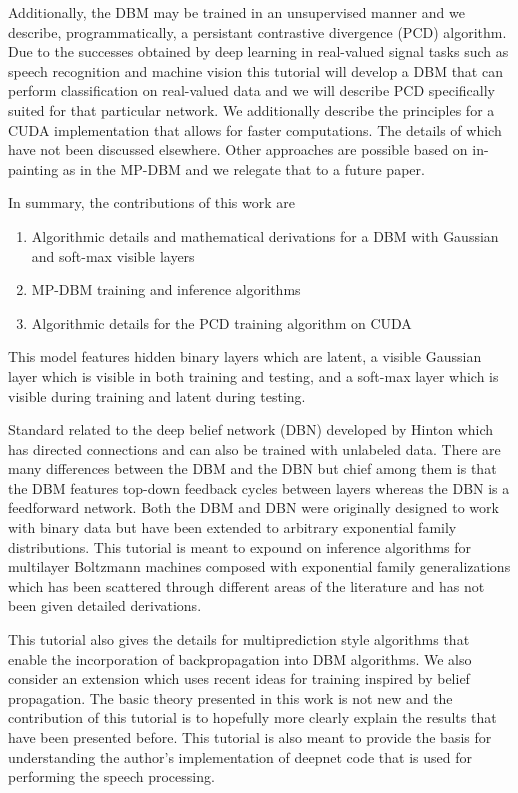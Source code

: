 \documentclass{article} %
\begin{document}
Additionally, the DBM may be trained in an unsupervised manner and we describe, programmatically, a persistant contrastive
divergence (PCD) algorithm. Due to the successes obtained by deep learning in real-valued signal
tasks such as speech recognition and machine vision this tutorial will
develop a DBM that can perform classification on real-valued data and we will describe PCD specifically suited for that
particular network.  We additionally describe the principles for a CUDA implementation
that allows for faster computations.  The details of which have not been discussed elsewhere.  Other approaches are possible based on in-painting
as in the MP-DBM and we relegate that to a future paper.

In summary, the contributions of this work are
\begin{enumerate}
\item Algorithmic details and mathematical derivations for a DBM with Gaussian and soft-max visible layers
\item MP-DBM training and inference algorithms
\item Algorithmic details for the PCD training algorithm on CUDA
\end{enumerate}


This model features hidden binary layers which are latent, a visible
Gaussian layer which is visible in both training and testing, and a
soft-max layer which is visible during training and latent during
testing.

  Standard related
to the deep belief network (DBN) developed by Hinton which has
directed connections and can also be trained with unlabeled data.
There are many differences between the DBM and the DBN but chief among
them is that the DBM features top-down feedback cycles between layers
whereas the DBN is a feedforward network.  Both the DBM and DBN were originally designed to work
with binary data but have been extended to arbitrary exponential family distributions.  This tutorial
is meant to expound on inference algorithms for multilayer Boltzmann machines composed with 
exponential family generalizations which has been scattered through different areas of the literature
and has not been given detailed derivations.

This tutorial also gives the details for multiprediction style algorithms that enable the incorporation
of backpropagation into DBM algorithms. We also consider an extension which uses recent ideas for training
inspired by belief propagation.  The basic theory presented in this work is not new and the contribution of this
tutorial is to hopefully more clearly explain the results that have been presented before. This tutorial is also meant
to provide the basis for understanding the author's implementation of deepnet code that is used for performing the
speech processing.
\end{document}
